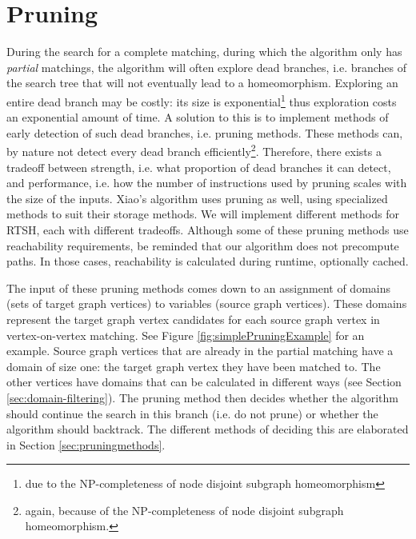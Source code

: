 \chapter{Pruning}
\label{chapter:pruning}

During the search for a complete matching, during which the algorithm only has \textit{partial} matchings, the algorithm will often explore dead branches, i.e. branches of the search tree that will not eventually lead to a homeomorphism. Exploring an entire dead branch may be costly: its size is exponential\footnote{due to the NP-completeness of node disjoint subgraph homeomorphism} thus exploration costs an exponential amount of time. A solution to this is to implement methods of early detection of such dead branches, i.e. pruning methods. These methods can, by nature not detect every dead branch efficiently\footnote{again, because of the NP-completeness of node disjoint subgraph homeomorphism.}. Therefore, there exists a tradeoff between strength, i.e. what proportion of dead branches it can detect, and performance, i.e. how the number of instructions used by pruning scales with the size of the inputs. Xiao's algorithm uses pruning as well, using specialized methods to suit their storage methods. We will implement different methods for RTSH, each with different tradeoffs. Although some of these pruning methods use reachability requirements, be reminded that our algorithm does not precompute paths. In those cases, reachability is calculated during runtime, optionally cached.

The input of these pruning methods comes down to an assignment of domains (sets of target graph vertices) to variables (source graph vertices). These domains represent the target graph vertex candidates for each source graph vertex in vertex-on-vertex matching. See Figure \ref{fig:simplePruningExample} for an example. Source graph vertices that are already in the partial matching have a domain of size one: the target graph vertex they have been matched to. The other vertices have domains that can be calculated in different ways (see Section \ref{sec:domain-filtering}). The pruning method then decides whether the algorithm should continue the search in this branch (i.e. do not prune) or whether the algorithm should backtrack. The different methods of deciding this are elaborated in Section \ref{sec:pruningmethods}.

